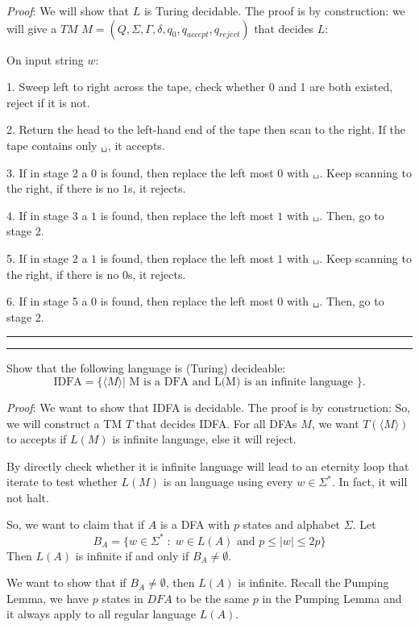 \documentclass[a4paper, 11pt]{article}
\newcommand{\question}[2] {\vspace{.25in} \hrule\vspace{0.5em}
	\noindent{\bf #1: #2} \vspace{0.5em}
	\hrule \vspace{.10in}}
\begin{document}
	{\em Proof}: %
	We will show that $L$ is Turing decidable. The proof is by construction: we will give a $TM$ $M = (Q, \Sigma, \Gamma, \delta, q_0 , q_{accept} , q_{reject})$ that decides $L$:
	
	On input string $w$:
	
	1. Sweep left to right across the tape, check whether 0 and 1 are both existed, reject if it is not.
	
	2. Return the head to the left-hand end of the tape then scan to the right. If the tape contains only $\texttt{\char32}$, it accepts.
	
	3. If in stage 2 a $0$ is found, then replace the left most $0$ with $\texttt{\char32}$. Keep scanning to the right, if there is no $1$s, it rejects.
	
	4. If in stage 3 a $1$ is found, then replace the left most $1$ with $\texttt{\char32}$. Then, go to stage 2.
	
	5. If in stage 2 a $1$ is found, then replace the left most $1$ with $\texttt{\char32}$. Keep scanning to the right, if there is no $0$s, it rejects.
	
	6. If in stage 5 a $0$ is found, then replace the left most $0$ with $\texttt{\char32}$. Then, go to stage 2.
	
	\question{5}{Infinite DFA}
	
	Show that the following language is (Turing) decideable:
	$$ \text{IDFA} = \{\langle M \rangle| \text{ M is a DFA and L(M) is an infinite language  } \}.$$
	
	{\em Proof}: We want to show that IDFA is decidable. The proof is by construction: So, we will construct a TM $T$ that decides IDFA. For all DFAs $M$, we want $T(\langle M \rangle)$ to accepts if $L(M)$ is infinite language, else it will reject. 
	
	By directly check whether it is infinite language will lead to an eternity loop that iterate to test whether $L(M)$ is an language using every $w \in \Sigma^*$. In fact, it will not halt.
	
	So, we want to claim that if $A$ is a DFA with $p$ states and alphabet $\Sigma$. Let
	$$ B_A = \{ w\in \Sigma^* \; : \; w \in L(A) \text{ and } p \leq |w| \leq 2p\}$$
	Then $L(A)$ is infinite if and only if $B_A \neq \emptyset$.
	
	We want to show that if $B_A \neq \emptyset$, then $L(A)$ is infinite. Recall the Pumping Lemma, we have $p$ states in $DFA$ to be the same $p$ in the Pumping Lemma and it always apply to all regular language $L(A)$. 
	
\end{document}
